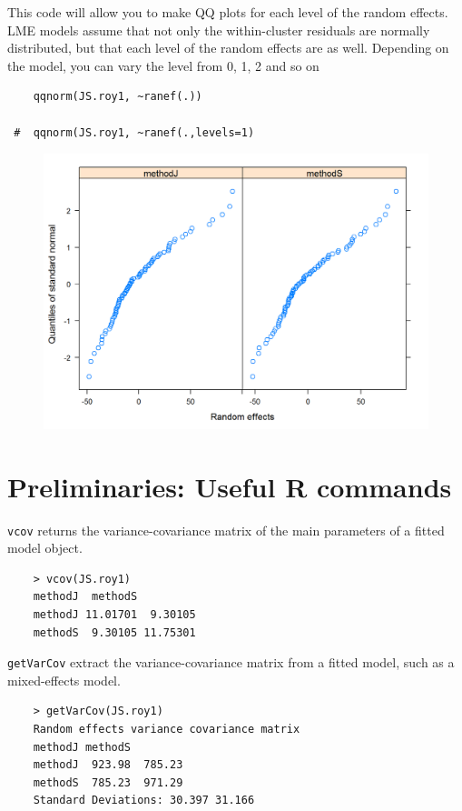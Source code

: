 \documentclass[Main.tex]{subfiles}
\begin{document}
This code will allow you to make QQ plots for each level of the random effects.  LME models assume that not only the within-cluster residuals are normally distributed, but that each level of the random effects are as well. Depending on the model, you can vary the level from 0, 1, 2 and so on
\begin{framed}
	\begin{verbatim}
	qqnorm(JS.roy1, ~ranef(.))

 # 	qqnorm(JS.roy1, ~ranef(.,levels=1)
	\end{verbatim}
\end{framed}
\begin{figure}[h!]
	\centering
	\includegraphics[width=0.9\linewidth]{images/ResidPlot2}
	\caption{}
	\label{fig:ResidPlot2}
\end{figure}


\section{Preliminaries: Useful R commands}


\texttt{vcov} returns the variance-covariance matrix of the main parameters of a fitted model object.
\begin{framed}
	\begin{verbatim}
	> vcov(JS.roy1)
	methodJ  methodS
	methodJ 11.01701  9.30105
	methodS  9.30105 11.75301
	\end{verbatim}
\end{framed}

\texttt{getVarCov} extract the variance-covariance matrix from a fitted model, such as a mixed-effects model.
\begin{framed}
	\begin{verbatim}
	> getVarCov(JS.roy1)
	Random effects variance covariance matrix
	methodJ methodS
	methodJ  923.98  785.23
	methodS  785.23  971.29
	Standard Deviations: 30.397 31.166 
	\end{verbatim}
\end{framed}	
\end{document}
